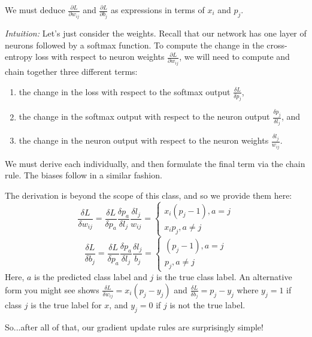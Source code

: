 We must deduce $\frac{\partial L}{\partial w_{ij}}$ and $\frac{\partial L}{\partial b_j}$ as expressions in terms of $x_i$ and $p_j$.

\emph{Intuition:} Let's just consider the weights. Recall that our network has one layer of neurons followed by a softmax function. To compute the change in the cross-entropy loss with respect to neuron weights $\frac{\partial L}{\partial w_{ij}}$, we will need to compute and chain together three different terms:
\begin{enumerate}
\itemsep0em
\listparindent0em
\topsep0em
\parsep0em
\partopsep0em
\item the change in the loss with respect to the softmax output $\frac{\delta L}{\delta p_j}$,
\item the change in the softmax output with respect to the neuron output $\frac{\delta p_j}{\delta l_j}$, and
\item the change in the neuron output with respect to the neuron weights $\frac{\delta l_j}{w_{ij}}$.
\end{enumerate}
We must derive each individually, and then formulate the final term via the chain rule. The biases follow in a similar fashion.

The derivation is beyond the scope of this class, and so we provide them here:
\begin{equation}
\frac{\delta L}{\delta w_{ij}} = \frac{\delta L}{\delta p_a} \frac{\delta p_a}{\delta l_j} \frac{\delta l_j}{w_{ij}} =\begin{cases}
x_i(p_j-1), a = j\\
x_ip_j,  a\neq j
\end{cases}
\label{eq:wupdate}
\end{equation}
\begin{equation}
\frac{\delta L}{\delta b_j} = \frac{\delta L}{\delta p_a} \frac{\delta p_a}{\delta l_j} \frac{\delta l_j}{b_j} =\begin{cases}
(p_j-1), a = j\\
p_j,  a\neq j
\end{cases}
\label{eq:bupdate}
\end{equation}
Here, $a$ is the predicted class label and $j$ is the true class label. An alternative form you might see shows $\frac{\delta L}{\delta w_{ij}} = x_i(p_j-y_j)$ and $\frac{\delta L}{\delta b_j} = p_j-y_j$ where $y_j=1$ if class $j$ is the true label for $x$, and $y_j = 0$ if $j$ is not the true label.

So...after all of that, our gradient update rules are surprisingly simple!


